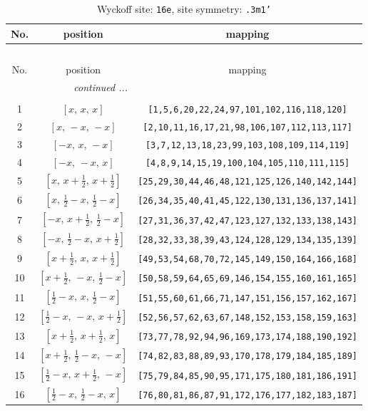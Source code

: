 \documentclass[fleqn,8pt]{jsarticle}
\begin{document}
\begin{longtable}{ccc}
\caption{Wyckoff site: {\tt 16e}, site symmetry: {\tt .3m1'}}
 \\
 \hline \hline
No. & position & mapping \\ \hline \endfirsthead

\multicolumn{2}{l}{\tablename\ \thetable{}} \\
 \hline \hline
No. & position & mapping \\ \hline \endhead

 \hline \hline
\multicolumn{2}{r}{\footnotesize\it continued ...} \\ \endfoot

 \hline \hline
\multicolumn{2}{r}{} \\ \endlastfoot

1 & $\left[ x,\, x,\, x \right]$ & {\tt [1,5,6,20,22,24,97,101,102,116,118,120]} \\ \hline
2 & $\left[ x,\, - x,\, - x \right]$ & {\tt [2,10,11,16,17,21,98,106,107,112,113,117]} \\ \hline
3 & $\left[ - x,\, x,\, - x \right]$ & {\tt [3,7,12,13,18,23,99,103,108,109,114,119]} \\ \hline
4 & $\left[ - x,\, - x,\, x \right]$ & {\tt [4,8,9,14,15,19,100,104,105,110,111,115]} \\ \hline
5 & $\left[ x,\, x + \frac{1}{2},\, x + \frac{1}{2} \right]$ & {\tt [25,29,30,44,46,48,121,125,126,140,142,144]} \\ \hline
6 & $\left[ x,\, \frac{1}{2} - x,\, \frac{1}{2} - x \right]$ & {\tt [26,34,35,40,41,45,122,130,131,136,137,141]} \\ \hline
7 & $\left[ - x,\, x + \frac{1}{2},\, \frac{1}{2} - x \right]$ & {\tt [27,31,36,37,42,47,123,127,132,133,138,143]} \\ \hline
8 & $\left[ - x,\, \frac{1}{2} - x,\, x + \frac{1}{2} \right]$ & {\tt [28,32,33,38,39,43,124,128,129,134,135,139]} \\ \hline
9 & $\left[ x + \frac{1}{2},\, x,\, x + \frac{1}{2} \right]$ & {\tt [49,53,54,68,70,72,145,149,150,164,166,168]} \\ \hline
10 & $\left[ x + \frac{1}{2},\, - x,\, \frac{1}{2} - x \right]$ & {\tt [50,58,59,64,65,69,146,154,155,160,161,165]} \\ \hline
11 & $\left[ \frac{1}{2} - x,\, x,\, \frac{1}{2} - x \right]$ & {\tt [51,55,60,61,66,71,147,151,156,157,162,167]} \\ \hline
12 & $\left[ \frac{1}{2} - x,\, - x,\, x + \frac{1}{2} \right]$ & {\tt [52,56,57,62,63,67,148,152,153,158,159,163]} \\ \hline
13 & $\left[ x + \frac{1}{2},\, x + \frac{1}{2},\, x \right]$ & {\tt [73,77,78,92,94,96,169,173,174,188,190,192]} \\ \hline
14 & $\left[ x + \frac{1}{2},\, \frac{1}{2} - x,\, - x \right]$ & {\tt [74,82,83,88,89,93,170,178,179,184,185,189]} \\ \hline
15 & $\left[ \frac{1}{2} - x,\, x + \frac{1}{2},\, - x \right]$ & {\tt [75,79,84,85,90,95,171,175,180,181,186,191]} \\ \hline
16 & $\left[ \frac{1}{2} - x,\, \frac{1}{2} - x,\, x \right]$ & {\tt [76,80,81,86,87,91,172,176,177,182,183,187]} \\
\end{longtable}
\end{document}
